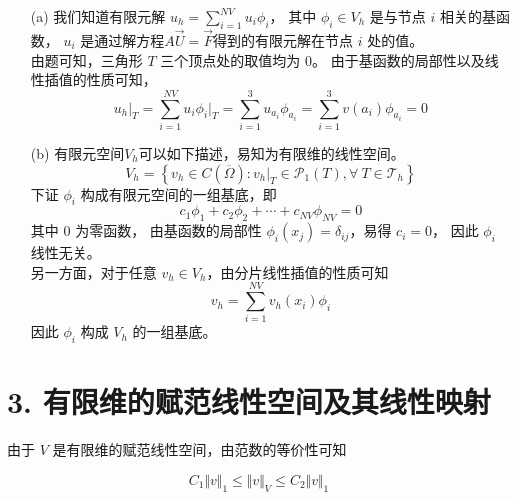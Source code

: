 \documentclass[a4paper]{article}
\begin{document}
\begin{enumerate}
    \item[(a)] 我们知道有限元解 $u_h = \sum_{i=1}^{NV}u_i\phi_i$，
        其中 $\phi_i\in V_h$ 是与节点 $i$ 相关的基函数，
        $u_i$ 是通过解方程$A\vec{U}=\vec{F}$得到的有限元解在节点 $i$ 处的值。\\
        由题可知，三角形 $T$ 三个顶点处的取值均为 $0$。
        由于基函数的局部性以及线性插值的性质可知，
        \begin{equation}
            u_h \big|_T = \sum_{i=1}^{NV}u_i\phi_i \big|_T 
                   = \sum_{i=1}^{3}u_{a_i}\phi_{a_i} 
                   = \sum_{i=1}^{3}v(a_i)\phi_{a_i} 
                   = 0
        \end{equation}

    \item[(b)] 有限元空间$V_h$可以如下描述，易知为有限维的线性空间。
        \begin{equation}
            V_h = 
            \left\{
                v_h \in C(\overline{\Omega}) :
                v_h \big|_T \in \mathcal{P}_1(T), 
                \forall \ T \in \mathcal{T}_h    
            \right\}
        \end{equation}
        下证 ${\phi_i}$ 构成有限元空间的一组基底，即
        \begin{equation}
            c_1 \phi_1 + c_2 \phi_2 + \cdots + c_{NV} \phi_{NV} = 0
        \end{equation}
        其中 $0$ 为零函数，
        由基函数的局部性 $\phi_i(x_j) = \delta_{ij}$，易得 $c_i=0$，
        因此 ${\phi_i}$ 线性无关。
        \\
        另一方面，对于任意 $v_h \in V_h$，由分片线性插值的性质可知
        \begin{equation}
            v_h = \sum_{i=1}^{NV} v_h(x_i) \phi_i
        \end{equation}
        因此 ${\phi_i}$ 构成 $V_h$ 的一组基底。
\end{enumerate} 

\section*{3. 有限维的赋范线性空间及其线性映射}

由于 $V$ 是有限维的赋范线性空间，由范数的等价性可知

\begin{equation}
    C_1 \Vert v \Vert_{1} \leq \Vert v \Vert_{V} \leq C_2 \Vert v \Vert_{1}
\end{equation}
\end{document}
